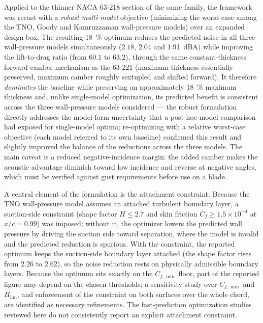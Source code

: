 \documentclass[preprint,3p,times]{elsarticle}
\begin{document}
Applied to the thinner NACA 63-218 section of the same family, the framework
was recast with a \emph{robust multi-model} objective (minimizing the worst
case among the TNO, Goody and Kamruzzaman wall-pressure models) over an
expanded design box. The resulting \SI{18}{\percent} optimum reduces the
predicted noise in all three wall-pressure models simultaneously
($2.18$, $2.04$ and \SI{1.91}{dBA}) while improving the lift-to-drag ratio
(from $60.1$ to $63.2$), through the same constant-thickness forward-camber
mechanism as the 63-221 (maximum thickness essentially preserved, maximum
camber roughly sextupled and shifted forward). It therefore \emph{dominates}
the baseline while preserving an approximately \SI{18}{\percent} maximum
thickness and, unlike single-model optimization, its predicted benefit is
consistent across the three wall-pressure models considered --- the robust
formulation directly addresses the model-form uncertainty that a post-hoc
model comparison had exposed for single-model optima; re-optimizing with a
relative worst-case objective (each model referred to its own baseline)
confirmed this result and slightly improved the balance of the reductions
across the three models. The main
caveat is a reduced negative-incidence
margin: the added camber makes the acoustic advantage diminish toward low
incidence and reverse at negative angles, which must be verified against gust
requirements before use on a blade.

A central element of the formulation is the attachment constraint. Because the
TNO wall-pressure model assumes an attached turbulent boundary layer, a
suction-side constraint (shape factor $H\le2.7$ and skin friction
$C_f\ge1.5\times10^{-4}$ at $x/c=0.99$) was imposed; without it, the optimizer
lowers the predicted wall pressure by driving the suction side toward
separation, where the model is invalid and the predicted reduction is spurious.
With the constraint, the reported optimum keeps the suction-side boundary layer
attached (the shape factor rises from $2.26$ to $2.62$), so the noise
reduction rests on physically admissible boundary layers. Because the
optimum sits exactly on the $C_{f,\min}$ floor, part of the reported figure
may depend on the chosen thresholds; a sensitivity study over $C_{f,\min}$
and $H_{\lim}$, and enforcement of the constraint on both surfaces over the
whole chord, are identified as necessary refinements. The fast-prediction
optimization studies reviewed here do not consistently report an explicit
attachment constraint.
\end{document}
